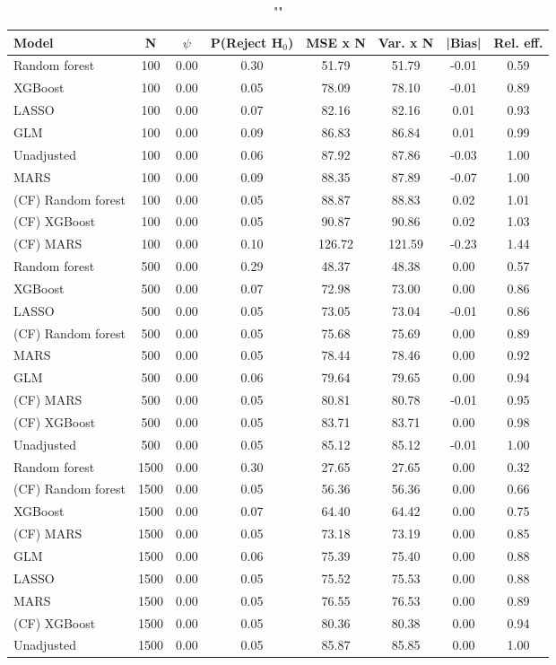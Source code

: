 
\begin{table}
\centering
\caption{""}
\begin{tabular}{lccccccc}
\toprule
Model & N & $\psi$ & P(Reject H$_0$) & MSE x N & Var. x N & |Bias| & Rel. eff.\\ \midrule
Random forest & 100 & 0.00 & 0.30 &  51.79 &  51.79 & -0.01 & 0.59 \\ 
XGBoost & 100 & 0.00 & 0.05 &  78.09 &  78.10 & -0.01 & 0.89 \\ 
LASSO & 100 & 0.00 & 0.07 &  82.16 &  82.16 &  0.01 & 0.93 \\ 
GLM & 100 & 0.00 & 0.09 &  86.83 &  86.84 &  0.01 & 0.99 \\ 
Unadjusted & 100 & 0.00 & 0.06 &  87.92 &  87.86 & -0.03 & 1.00 \\ 
MARS & 100 & 0.00 & 0.09 &  88.35 &  87.89 & -0.07 & 1.00 \\ 
(CF) Random forest & 100 & 0.00 & 0.05 &  88.87 &  88.83 &  0.02 & 1.01 \\ 
(CF) XGBoost & 100 & 0.00 & 0.05 &  90.87 &  90.86 &  0.02 & 1.03 \\ 
(CF) MARS & 100 & 0.00 & 0.10 & 126.72 & 121.59 & -0.23 & 1.44 \\ \addlinespace 
Random forest & 500 & 0.00 & 0.29 &  48.37 &  48.38 &  0.00 & 0.57 \\ 
XGBoost & 500 & 0.00 & 0.07 &  72.98 &  73.00 &  0.00 & 0.86 \\ 
LASSO & 500 & 0.00 & 0.05 &  73.05 &  73.04 & -0.01 & 0.86 \\ 
(CF) Random forest & 500 & 0.00 & 0.05 &  75.68 &  75.69 &  0.00 & 0.89 \\ 
MARS & 500 & 0.00 & 0.05 &  78.44 &  78.46 &  0.00 & 0.92 \\ 
GLM & 500 & 0.00 & 0.06 &  79.64 &  79.65 &  0.00 & 0.94 \\ 
(CF) MARS & 500 & 0.00 & 0.05 &  80.81 &  80.78 & -0.01 & 0.95 \\ 
(CF) XGBoost & 500 & 0.00 & 0.05 &  83.71 &  83.71 &  0.00 & 0.98 \\ 
Unadjusted & 500 & 0.00 & 0.05 &  85.12 &  85.12 & -0.01 & 1.00 \\ \addlinespace 
Random forest & 1500 & 0.00 & 0.30 &  27.65 &  27.65 &  0.00 & 0.32 \\ 
(CF) Random forest & 1500 & 0.00 & 0.05 &  56.36 &  56.36 &  0.00 & 0.66 \\ 
XGBoost & 1500 & 0.00 & 0.07 &  64.40 &  64.42 &  0.00 & 0.75 \\ 
(CF) MARS & 1500 & 0.00 & 0.05 &  73.18 &  73.19 &  0.00 & 0.85 \\ 
GLM & 1500 & 0.00 & 0.06 &  75.39 &  75.40 &  0.00 & 0.88 \\ 
LASSO & 1500 & 0.00 & 0.05 &  75.52 &  75.53 &  0.00 & 0.88 \\ 
MARS & 1500 & 0.00 & 0.05 &  76.55 &  76.53 &  0.00 & 0.89 \\ 
(CF) XGBoost & 1500 & 0.00 & 0.05 &  80.36 &  80.38 &  0.00 & 0.94 \\ 
Unadjusted & 1500 & 0.00 & 0.05 &  85.87 &  85.85 &  0.00 & 1.00 \\
\bottomrule
\end{tabular}
\end{table}

